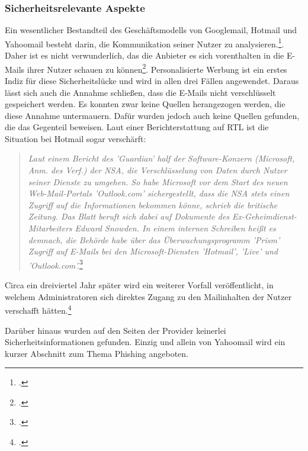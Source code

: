 \documentclass  [paper=a4,
				fontsize=12pt,
				listof=totoc,
				bibliography=totoc
				]{scrreprt}
\begin{document}
			\subsubsection{Sicherheitsrelevante Aspekte}
			Ein wesentlicher Bestandteil des Geschäftsmodells von Googlemail, Hotmail und Yahoomail besteht darin, die Kommunikation seiner Nutzer zu analysieren.\footcite[Vgl.][]{Kirsch}. Daher ist es nicht verwunderlich, das die Anbieter es sich vorenthalten in die E-Mails ihrer Nutzer schauen zu können\footcite[Vgl.][]{Schwan}. Personalisierte Werbung ist ein erstes Indiz für diese Sicherheitslücke und wird in allen drei Fällen angewendet. Daraus lässt sich auch die Annahme schließen, dass die E-Mails nicht verschlüsselt gespeichert werden. Es konnten zwar keine Quellen herangezogen werden, die diese Annahme untermauern. Dafür wurden jedoch auch keine Quellen gefunden, die das Gegenteil beweisen.
			Laut einer Berichterstattung auf RTL ist die Situation bei Hotmail sogar verschärft:
			\begin{quote}

			\textit{ Laut einem Bericht des 'Guardian' half der Software-Konzern (Microsoft, Anm. des Verf.) der NSA, die Verschlüsselung von Daten durch Nutzer seiner Dienste zu umgehen. So habe Microsoft vor dem Start des neuen Web-Mail-Portals 'Outlook.com' sichergestellt, dass die NSA stets einen Zugriff auf die Informationen bekommen könne, schrieb die britische Zeitung. Das Blatt beruft sich dabei auf Dokumente des Ex-Geheimdienst- Mitarbeiters Edward Snowden. In einem internen Schreiben heißt es demnach, die Behörde habe über das Überwachungsprogramm 'Prism' Zugriff auf E-Mails bei den Microsoft-Diensten 'Hotmail', 'Live' und 'Outlook.com'.}\footcite[Vgl.][]{Guardian}
			\end{quote}  
			Circa ein dreiviertel Jahr später wird ein weiterer Vorfall veröffentlicht, in welchem Administratoren sich direktes Zugang zu den Mailinhalten der Nutzer verschafft hätten.\footcite[Vgl.][]{Mailbox2014M}
			\medskip
			
			Darüber hinaus wurden auf den Seiten der Provider keinerlei Sicherheitsinformationen gefunden. Einzig und allein von Yahoomail wird ein kurzer Abschnitt zum Thema Phishing angeboten.
			
\end{document}
